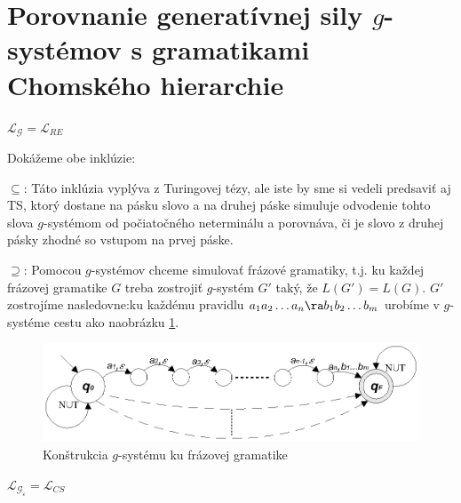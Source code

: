 \section{Porovnanie generatívnej sily $g$-systémov s gramatikami Chomského hierarchie}

\begin{veta}
\label{gs_veta_gre} $\mathcal{L}_{\mathcal{G}}=\mathcal{L}_{RE}$
\end{veta}

\begin{dokaz}
Dokážeme obe inklúzie:
\begin{description}
\item{$\subseteq$:} Táto inklúzia vyplýva z Turingovej tézy, ale
iste by sme si vedeli predsaviť aj TS, ktorý dostane na pásku
slovo a na druhej páske simuluje odvodenie tohto slova
$g$-systémom od počiatočného neterminálu a porovnáva, či je slovo
z druhej pásky zhodné so vstupom na prvej páske.
\item{$\supseteq$:} Pomocou $g$-systémov chceme simulovať frázové gramatiky, t.j. ku každej
frázovej gramatike $G$ treba zostrojiť $g$-systém $G'$ taký, že
$L(G')=L(G)$. $G'$ zostrojíme nasledovne:\newline ku každému
pravidlu $a_1a_2\dots a_n\ra b_1b_2\dots b_m$ urobíme v
$g$-systéme cestu ako na\linebreak obrázku \ref{gs_obr_gre}.
\end{description}
\end{dokaz}

\begin{figure}[!ht]
\centering
\includegraphics{./OBRAZKY/GSYSTEMS/RE_G}
\caption{Konštrukcia $g$-systému ku frázovej gramatike}\label{gs_obr_gre}
\end{figure}

\pagebreak

\begin{veta}
\label{gs_veta_gre2}
$\mathcal{L}_{\mathcal{G}_\varepsilon}=\mathcal{L}_{CS}$
\end{veta}

